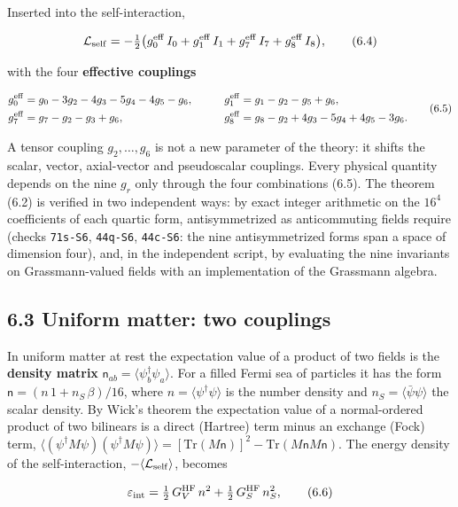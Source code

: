 \documentclass[
  10pt,
]{article}
\begin{document}
Inserted into the self-interaction,

\[\mathcal L_{\rm self}=-\tfrac12\big(g_0^{\rm eff}\,I_0+g_1^{\rm eff}\,I_1+g_7^{\rm eff}\,I_7+g_8^{\rm eff}\,I_8\big),\tag{6.4}\]

with the four \textbf{effective couplings}

\[\begin{aligned}
g_0^{\rm eff}&=g_0-3g_2-4g_3-5g_4-4g_5-g_6,&\qquad g_1^{\rm eff}&=g_1-g_2-g_5+g_6,\\
g_7^{\rm eff}&=g_7-g_2-g_3+g_6,&\qquad g_8^{\rm eff}&=g_8-g_2+4g_3-5g_4+4g_5-3g_6.
\end{aligned}\tag{6.5}\]

A tensor coupling \(g_2,\dots,g_6\) is not a new parameter of the
theory: it shifts the scalar, vector, axial-vector and pseudoscalar
couplings. Every physical quantity depends on the nine \(g_r\) only
through the four combinations (6.5). The theorem (6.2) is verified in
two independent ways: by exact integer arithmetic on the \(16^4\)
coefficients of each quartic form, antisymmetrized as anticommuting
fields require (checks \texttt{71s-S6}, \texttt{44q-S6},
\texttt{44c-S6}: the nine antisymmetrized forms span a space of
dimension four), and, in the independent script, by evaluating the nine
invariants on Grassmann-valued fields with an implementation of the
Grassmann algebra.

\hypertarget{uniform-matter-two-couplings}{%
\subsection{6.3 Uniform matter: two
couplings}\label{uniform-matter-two-couplings}}

In uniform matter at rest the expectation value of a product of two
fields is the \textbf{density matrix}
\(\mathsf n_{ab}=\langle\psi_b^\dagger\psi_a\rangle\). For a filled
Fermi sea of particles it has the form
\(\mathsf n=(n\,1+n_S\,\beta)/16\), where
\(n=\langle\psi^\dagger\psi\rangle\) is the number density and
\(n_S=\langle\bar\psi\psi\rangle\) the scalar density. By Wick's theorem
the expectation value of a normal-ordered product of two bilinears is a
direct (Hartree) term minus an exchange (Fock) term,
\(\langle(\psi^\dagger M\psi)(\psi^\dagger M\psi)\rangle=[\mathrm{Tr}(M\mathsf n)]^2-\mathrm{Tr}(M\mathsf n M\mathsf n)\).
The energy density of the self-interaction,
\(-\langle\mathcal L_{\rm self}\rangle\), becomes

\[\varepsilon_{\rm int}=\tfrac12\,G_V^{\rm HF}\,n^2+\tfrac12\,G_S^{\rm HF}\,n_S^2,\tag{6.6}\]
\end{document}
